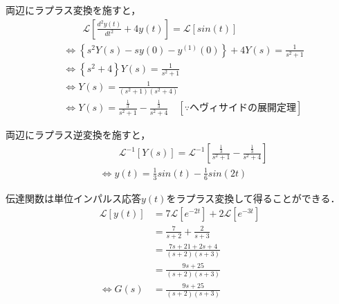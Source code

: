 \documentclass[a4paper,12pt]{article}
\begin{document}
\begin{tcolorbox}[title={[20] つぎの微分方程式をラプラス変換を用いて解け．\\
  \[
  \frac{d^2y(t)}{dt^2} + 4 y(t) = sin(t)
  \]
  
  \quad ただし，初期条件は，\(y(0)=0, y^{(1)}(0)=0\) とする． }]


    \quad 両辺にラプラス変換を施すと，
    \vspace{-3mm}
    \begin{align*}
        &\qquad \mathcal{L}\left[ \frac{d^2y(t)}{dt^2} + 4 y(t) \right] 
        = \mathcal{L} \left[ sin(t) \right] \\
        &\Leftrightarrow \left\{ s^2 Y(s) - sy(0) - y^{(1)}(0) \right\}
        + 4 Y(s) = \frac{1}{s^2 + 1}  \\
        &\Leftrightarrow \left\{ s^2 + 4 \right\} Y(s) = \frac{1}{s^2 + 1}  \\
        &\Leftrightarrow Y(s) = \frac{1}{(s^2+1)(s^2+4)}  \\
        &\Leftrightarrow Y(s) = \frac{ \frac{1}{3} }{s^2+1} - \frac{ \frac{1}{3} }{s^2+4} 
        \quad \left[\because ヘヴィサイドの展開定理 \right]
    \end{align*}
        
    \quad 両辺にラプラス逆変換を施すと，
    \vspace{-3mm}
    \begin{align*}
    &\qquad \mathcal{L}^{-1} \left[ Y(s) \right] 
    = \mathcal{L}^{-1} \left[  \frac{ \frac{1}{3} }{s^2+1} - \frac{ \frac{1}{3} }{s^2+4}   \right] \\
    &\Leftrightarrow y(t) = \frac{1}{3}sin(t) - \frac{1}{6}sin(2t)
    \end{align*}
  \end{tcolorbox}
\begin{tcolorbox}[title={[21] 単位インパルス応答が\(y(t)=7e^{-2t}+2e^{-3t}\)であるとき，\\ 
    \qquad このシステムの伝達関数を求めよ． }]

    伝達関数は単位インパルス応答\(y(t)\)をラプラス変換して得ることができる．
    \begin{align*}
        \mathcal{L} \left[ y(t) \right] 
        &= 7 \mathcal{L} \left[ e^{-2t} \right]+2 \mathcal{L} \left[ e^{-3t} \right]\\
        &= \frac{7}{s+2} + \frac{2}{s+3}\\
        &= \frac{7s+21+2s+4}{(s+2)(s+3)}\\
        &= \frac{9s+25}{(s+2)(s+3)}\\
        \Leftrightarrow G(s) &= \frac{9s+25}{(s+2)(s+3)}
    \end{align*}

\end{tcolorbox}
\end{document}
